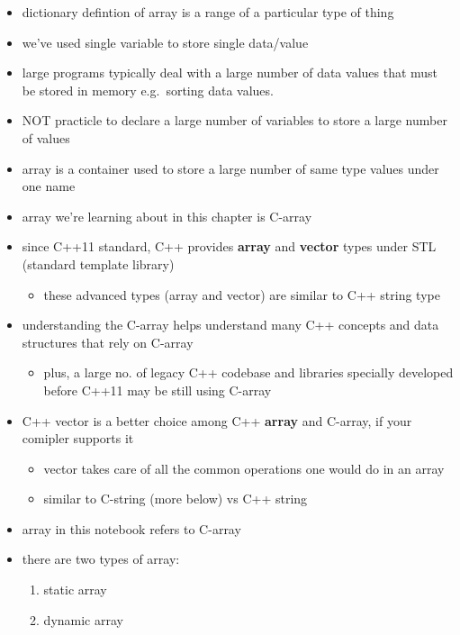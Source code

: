 \documentclass[11pt]{article}
\providecommand{\tightlist}{%
      \setlength{\itemsep}{0pt}\setlength{\parskip}{0pt}}
\begin{document}
\begin{itemize}
\tightlist
\item
  dictionary defintion of array is a range of a particular type of thing
\item
  we've used single variable to store single data/value
\item
  large programs typically deal with a large number of data values that
  must be stored in memory e.g.~sorting data values.
\item
  NOT practicle to declare a large number of variables to store a large
  number of values
\item
  array is a container used to store a large number of same type values
  under one name
\item
  array we're learning about in this chapter is C-array
\item
  since C++11 standard, C++ provides \textbf{array} and \textbf{vector}
  types under STL (standard template library)

  \begin{itemize}
  \tightlist
  \item
    these advanced types (array and vector) are similar to C++ string
    type
  \end{itemize}
\item
  understanding the C-array helps understand many C++ concepts and data
  structures that rely on C-array

  \begin{itemize}
  \tightlist
  \item
    plus, a large no. of legacy C++ codebase and libraries specially
    developed before C++11 may be still using C-array
  \end{itemize}
\item
  C++ vector is a better choice among C++ \textbf{array} and C-array, if
  your comipler supports it

  \begin{itemize}
  \tightlist
  \item
    vector takes care of all the common operations one would do in an
    array
  \item
    similar to C-string (more below) vs C++ string
  \end{itemize}
\item
  array in this notebook refers to C-array
\item
  there are two types of array:

  \begin{enumerate}
  \def\labelenumi{\arabic{enumi}.}
  \tightlist
  \item
    static array
  \item
    dynamic array
  \end{enumerate}
\end{itemize}
\end{document}
